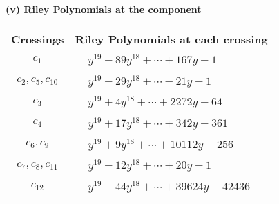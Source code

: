 \documentclass[1p]{elsarticle_modified}
\theoremstyle{definition}
\begin{document}
\flushleft \textbf{(v) Riley Polynomials at the component}\newline \\
\begin{tabular}{m{50pt}|m{274pt}}
Crossings & \hspace{64pt}Riley Polynomials at each crossing \\
\hline $$\begin{aligned}c_{1}\end{aligned}$$&$\begin{aligned}
&y^{19}-89 y^{18}+\cdots+167 y-1
\end{aligned}$\\
\hline $$\begin{aligned}c_{2},c_{5},c_{10}\end{aligned}$$&$\begin{aligned}
&y^{19}-29 y^{18}+\cdots-21 y-1
\end{aligned}$\\
\hline $$\begin{aligned}c_{3}\end{aligned}$$&$\begin{aligned}
&y^{19}+4 y^{18}+\cdots+2272 y-64
\end{aligned}$\\
\hline $$\begin{aligned}c_{4}\end{aligned}$$&$\begin{aligned}
&y^{19}+17 y^{18}+\cdots+342 y-361
\end{aligned}$\\
\hline $$\begin{aligned}c_{6},c_{9}\end{aligned}$$&$\begin{aligned}
&y^{19}+9 y^{18}+\cdots+10112 y-256
\end{aligned}$\\
\hline $$\begin{aligned}c_{7},c_{8},c_{11}\end{aligned}$$&$\begin{aligned}
&y^{19}-12 y^{18}+\cdots+20 y-1
\end{aligned}$\\
\hline $$\begin{aligned}c_{12}\end{aligned}$$&$\begin{aligned}
&y^{19}-44 y^{18}+\cdots+39624 y-42436
\end{aligned}$\\
\hline
\end{tabular}\\~\\
\end{document}

